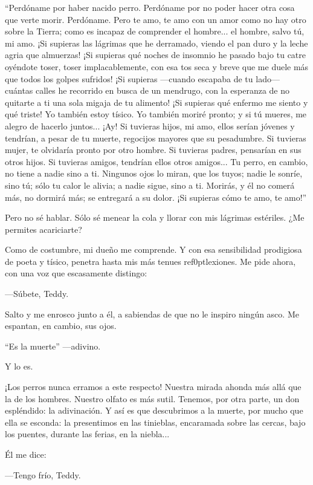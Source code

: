 \documentclass[14pt,a5paper,oneside,final]{extbook}
\begin{document}
``Perdóname por haber nacido perro. Perdóname por no poder hacer otra cosa que verte morir. Perdóname. Pero te amo, te amo con un amor como no hay otro sobre la Tierra; como es incapaz de comprender el hombre... el hombre, salvo tú, mi amo. ¡Si supieras las lágrimas que he derramado, viendo el pan duro y la leche agria que almuerzas! ¡Si supieras qué noches de insomnio he pasado bajo tu catre oyéndote toser, toser implacablemente, con esa tos seca y breve que me duele más que todos los golpes sufridos! ¡Si supieras ---cuando escapaba de tu lado--- cuántas calles he recorrido en busca de un mendrugo, con la esperanza de no quitarte a ti una sola migaja de tu alimento! ¡Si supieras qué enfermo me siento y qué triste! Yo también estoy tísico. Yo también moriré pronto; y si tú mueres, me alegro de hacerlo juntos... ¡Ay! Si tuvieras hijos, mi amo, ellos serían jóvenes y tendrían, a pesar de tu muerte, regocijos mayores que su pesadumbre. Si tuvieras mujer, te olvidaría pronto por otro hombre. Si tuvieras padres, pensarían en sus otros hijos. Si tuvieras amigos, tendrían ellos otros amigos... Tu perro, en cambio, no tiene a nadie sino a ti. Ningunos ojos lo miran, que los tuyos; nadie le sonríe, sino tú; sólo tu calor le alivia; a nadie sigue, sino a ti. Morirás, y él no comerá más, no dormirá más; se entregará a su dolor. ¡Si supieras cómo te amo, te amo!''

Pero no sé hablar. Sólo sé menear la cola y llorar con mis lágrimas estériles. ¿Me permites acariciarte?

Como de costumbre, mi dueño me comprende. Y con esa sensibilidad prodigiosa de poeta y tísico, penetra hasta mis más tenues ref\kern0ptlexiones. Me pide ahora, con una voz que escasamente distingo:

---Súbete, Teddy.

Salto y me enrosco junto a él, a sabiendas de que no le inspiro ningún asco. Me espantan, en cambio, sus ojos.

``Es la muerte'' ---adivino.

Y lo es.

¡Los perros nunca erramos a este respecto! Nuestra mirada ahonda más allá que la de los hombres. Nuestro olfato es más sutil. Tenemos, por otra parte, un don espléndido: la adivinación. Y así es que descubrimos a la muerte, por mucho que ella se esconda: la presentimos en las tinieblas, encaramada sobre las cercas, bajo los puentes, durante las ferias, en la niebla...

Él me dice:

---Tengo frío, Teddy.
\end{document}
